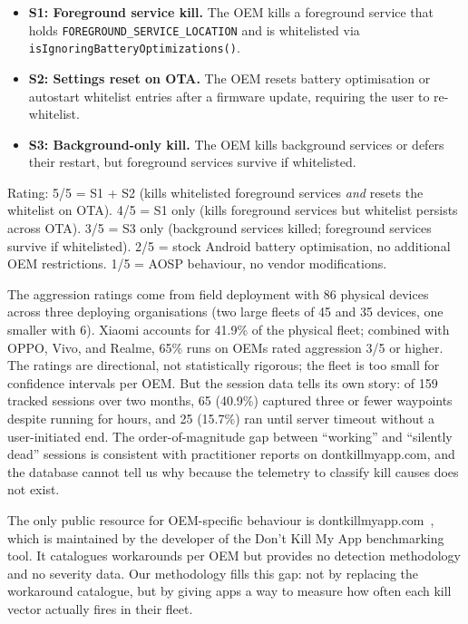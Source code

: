 \documentclass[10pt,journal,compsoc]{IEEEtran}
\begin{document}
\begin{itemize}[nosep]
  \item \textbf{S1: Foreground service kill.} The OEM kills a foreground
        service that holds \texttt{FOREGROUND\_SERVICE\_LOCATION} and is
        whitelisted via \texttt{isIgnoringBatteryOptimizations()}.
  \item \textbf{S2: Settings reset on OTA.} The OEM resets battery
        optimisation or autostart whitelist entries after a firmware
        update, requiring the user to re-whitelist.
  \item \textbf{S3: Background-only kill.} The OEM kills background
        services or defers their restart, but foreground services survive
        if whitelisted.
\end{itemize}

\noindent Rating: 5/5 = S1 + S2 (kills whitelisted foreground services
\emph{and} resets the whitelist on OTA). 4/5 = S1 only (kills
foreground services but whitelist persists across OTA). 3/5 = S3 only
(background services killed; foreground services survive if whitelisted).
2/5 = stock Android battery optimisation, no additional OEM
restrictions. 1/5 = AOSP behaviour, no vendor modifications.

The aggression ratings come from field deployment with 86 physical
devices across three deploying organisations (two large fleets of 45 and
35 devices, one smaller with 6). Xiaomi accounts for 41.9\% of the
physical fleet; combined with OPPO, Vivo, and Realme, 65\% runs on
OEMs rated aggression 3/5 or higher. The ratings are directional, not
statistically rigorous; the fleet is too small for confidence intervals
per OEM. But the session data tells its own story: of 159 tracked
sessions over two months, 65 (40.9\%) captured three or fewer waypoints
despite running for hours, and 25 (15.7\%) ran until server timeout
without a user-initiated end. The order-of-magnitude gap between
``working'' and ``silently dead'' sessions is consistent with
practitioner reports on dontkillmyapp.com, and the database cannot tell
us why because the telemetry to classify kill causes does not exist.

The only public resource for OEM-specific behaviour is
dontkillmyapp.com~\cite{dontkillmyapp}, which is maintained by the
developer of the Don't Kill My App benchmarking tool. It catalogues
workarounds per OEM but provides no detection methodology and no
severity data. Our methodology fills this gap: not by replacing the
workaround catalogue, but by giving apps a way to measure how often
each kill vector actually fires in their fleet.
\end{document}
